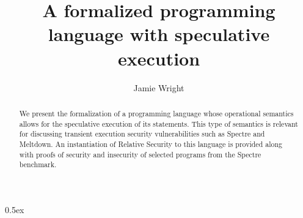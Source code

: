 \documentclass[11pt,a4paper]{article}
\begin{document}
\title{A formalized programming language with speculative execution}
\author{Jamie Wright}
\maketitle

\begin{abstract}
We present the formalization of a programming language whose operational semantics allows for the speculative execution of its statements. This type of semantics is relevant for discussing transient execution security vulnerabilities such as Spectre and Meltdown. An instantiation of Relative Security to this language is provided along with proofs of security and insecurity of selected programs from the Spectre benchmark. 
\end{abstract} 

\tableofcontents

\parindent 0pt\parskip 0.5ex



%
%

\cite{Concrete}
\cite{Cheang}




\end{document}
